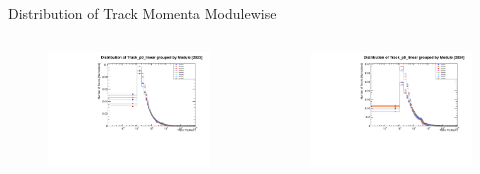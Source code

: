 
\begin{frame}{Distribution of Track Momenta Modulewise}
    \begin{columns}
        \begin{column}{0.6\linewidth}
            \begin{figure}
                \centering
                \includegraphics[width=\linewidth]{./ModuleLevelPlots/Track_p0_linear_st0_2023.pdf}
            \end{figure}
        \end{column}
        \begin{column}{0.6\linewidth}
            \begin{figure}
                \centering
                \includegraphics[width=\linewidth]{./ModuleLevelPlots/Track_p0_linear_st0_2024.pdf}

\end{figure}
\end{column}
\end{columns}
\end{frame}
